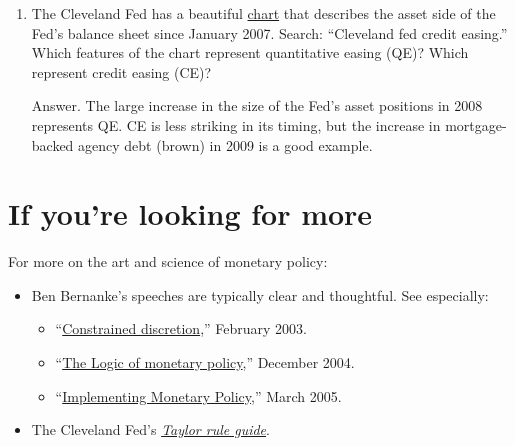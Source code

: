 \begin{enumerate}
%

\item The Cleveland Fed has a beautiful
\href{http://www.clevelandfed.org/research/data/credit_easing/index.cfm}{chart}
that describes the asset side of the Fed's balance sheet since January 2007.
Search:  ``Cleveland fed credit easing.''
Which features of the chart represent quantitative easing (QE)?
Which represent credit easing (CE)?

Answer.
The large increase in the size of the Fed's asset positions in 2008
represents QE.
CE is less striking in its timing, but the increase in mortgage-backed
agency debt (brown) in 2009 is a good example.

\end{enumerate}


\section*{If you're looking for more}

For more on the art and science of monetary policy:
%
\begin{itemize}
\item Ben Bernanke's speeches are typically clear and thoughtful.
See especially:
\begin{itemize}
\item
``\href{http://www.federalreserve.gov/boarddocs/speeches/2003/20030203/default.htm}
{Constrained discretion},'' February 2003.

\item ``\href{http://www.federalreserve.gov/boarddocs/Speeches/2004/20041202/default.htm}
{The Logic of monetary policy},'' December 2004.

\item
``\href{http://www.federalreserve.gov/BoardDocs/Speeches/2005/20050330/default.htm}
{Implementing Monetary Policy},''
March 2005.

\end{itemize}
\item The Cleveland Fed's
\href{https://www.clevelandfed.org/research/commentary/2003/0703.pdf}
{\it Taylor rule guide\/}.
\end{itemize}


